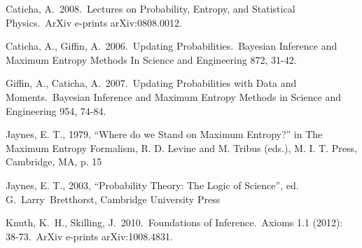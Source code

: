 \documentclass[letterpaper, 11pt]{article}
\begin{document}
\begin{thebibliography}{}
 Caticha, A.\ 2008.\ Lectures 
on Probability, Entropy, and Statistical Physics.\ ArXiv e-prints 
arXiv:0808.0012. 

 Caticha, A., 
Giffin, A.\ 2006.\ Updating Probabilities.\ Bayesian Inference and Maximum 
Entropy Methods In Science and Engineering 872, 31-42.

 Giffin, A., 
Caticha, A.\ 2007.\ Updating Probabilities with Data and Moments.\ Bayesian 
Inference and Maximum Entropy Methods in Science and Engineering 954, 
74-84.

 Jaynes, E. T., 1979, ``Where do we Stand on Maximum Entropy?'' in The Maximum Entropy Formalism, R. D. Levine and M. Tribus (eds.), M. I. T. Press, Cambridge, MA, p. 15

 Jaynes, E. T., 2003, ``Probability Theory:
The Logic of Science'', ed. G.~Larry~Bretthorst, Cambridge University Press

 Knuth, K.~H., 
Skilling, J.\ 2010.\ Foundations of Inference.\
Axioms 1.1 (2012): 38-73.\
ArXiv e-prints arXiv:1008.4831. 
\end{thebibliography}
\end{document}
